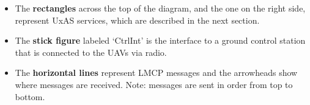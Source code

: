 \begin{itemize}
	\item The \textbf{rectangles} across the top of the diagram, and the one on the right side, represent UxAS services, which are described in the next section. 
	\item The \textbf{stick figure} labeled `CtrlInt' is the interface to a ground control station that is connected to the UAVs via radio. 
	\item The \textbf{horizontal lines} represent LMCP messages and the arrowheads show where messages are received. Note: messages are sent in order from top to bottom.
\end{itemize}

